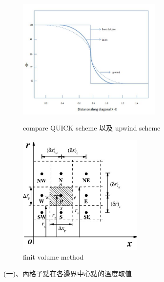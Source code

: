 \documentclass[12pt]{article}
\begin{document}
\begin{figure}[H]
    \centering
    \begin{minipage}{0.45\textwidth}
        \centering
        \includegraphics[width=\textwidth, height=6cm]{8.jpg}
        \caption{compare QUICK scheme 以及 upwind scheme}
        \label{fig:quick1}
    \end{minipage}
    \hfill
    \begin{minipage}{0.45\textwidth}
        \centering
        \includegraphics[width=\textwidth, height=6cm]{4.jpg}
        \caption{finit volume method}
        \label{fig:quick2}
    \end{minipage}
\end{figure}
\noindent (一)、內格子點在各邊界中心點的溫度取值\\
\end{document}
